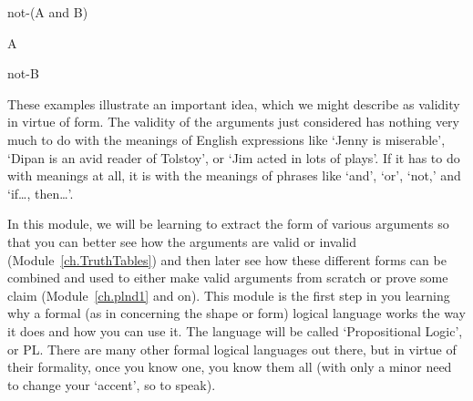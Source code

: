 \begin{center}
\begin{earg}
\item[]not-(A and B)
\item[]A 
\item[\therefore] not-B
\end{earg}
\end{center}
These examples illustrate an important idea, which we might describe as validity in virtue of form. The validity of the arguments just considered has nothing very much to do with the meanings of English expressions like ‘Jenny is miserable’, ‘Dipan is an avid reader of Tolstoy’, or ‘Jim acted in lots of plays’. If it has to do with meanings at all, it is with the meanings of phrases like ‘and’, ‘or’, ‘not,’ and ‘if\ldots, then\ldots’.

In this module, we will be learning to extract the form of various arguments so that you can better see how the arguments are valid or invalid (Module~\ref{ch.TruthTables}) and then later see how these different forms can be combined and used to either make valid arguments from scratch or prove some claim (Module~\ref{ch.plnd1} and on). This module is the first step in you learning why a formal (as in concerning the shape or form) logical language works the way it does and how you can use it. The language will be called ‘Propositional Logic', or PL. There are many other formal logical languages out there, but in virtue of their formality, once you know one, you know them all (with only a minor need to change your ‘accent', so to speak).
